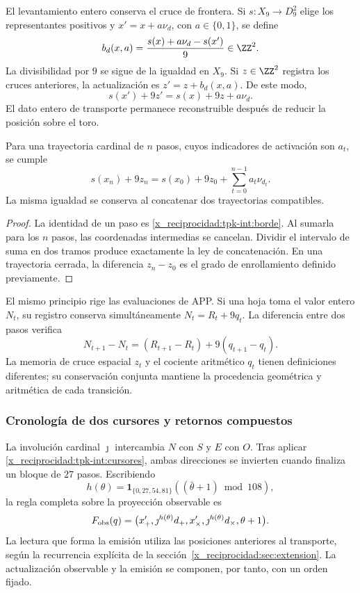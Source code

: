 El levantamiento entero conserva el cruce de frontera. Si
\(s:X_9\to D_9^2\) elige los representantes positivos y
\(x'=x+a\nu_d\), con \(a\in\{0,1\}\), se define
\begin{equation}
 b_d(x,a)=\frac{s(x)+a\nu_d-s(x')}{9}\in\ZZ^2.
 \label{x_reciprocidad:tpk-int:borde}
\end{equation}
La divisibilidad por \(9\) se sigue de la igualdad en \(X_9\).
Si \(z\in\ZZ^2\) registra los cruces anteriores, la actualización es
\(z'=z+b_d(x,a)\). De este modo,
\[
 s(x')+9z'=s(x)+9z+a\nu_d.
\]
El dato entero de transporte permanece reconstruible después de reducir
la posición sobre el toro.

\begin{proposition}
\label{x_reciprocidad:tpk-int:prop-desplazamiento}
Para una trayectoria cardinal de \(n\) pasos, cuyos indicadores de
activación son \(a_t\), se cumple
\[
 s(x_n)+9z_n=s(x_0)+9z_0+
 \sum_{t=0}^{n-1}a_t\nu_{d_t}.
\]
La misma igualdad se conserva al concatenar dos trayectorias compatibles.
\end{proposition}
\begin{proof}
La identidad de un paso es \eqref{x_reciprocidad:tpk-int:borde}. Al sumarla para los
\(n\) pasos, las coordenadas intermedias se cancelan. Dividir el intervalo
de suma en dos tramos produce exactamente la ley de concatenación. En una
trayectoria cerrada, la diferencia \(z_n-z_0\) es el grado de
enrollamiento definido previamente.
\end{proof}

El mismo principio rige las evaluaciones de APP. Si una hoja toma el
valor entero \(N_t\), su registro conserva simultáneamente
\(N_t=R_t+9q_t\). La diferencia entre dos pasos verifica
\[
 N_{t+1}-N_t=(R_{t+1}-R_t)+9(q_{t+1}-q_t).
\]
La memoria de cruce espacial \(z_t\) y el cociente aritmético \(q_t\)
tienen definiciones diferentes; su conservación conjunta mantiene la
procedencia geométrica y aritmética de cada transición.

\subsubsection{Cronología de dos cursores y retornos compuestos}
\label{x_reciprocidad:tpk-int:cronologia}

La involución cardinal \(\jmath\) intercambia \(N\) con \(S\) y
\(E\) con \(O\). Tras aplicar \eqref{x_reciprocidad:tpk-int:cursores}, ambas
direcciones se invierten cuando finaliza un bloque de \(27\) pasos.
Escribiendo
\[
 h(\theta)=\mathbf1_{\{0,27,54,81\}}
             ((\bar\theta+1)\bmod108),
\]
la regla completa sobre la proyección observable es
\begin{equation}
 F_{\rm obs}(q)=
 \bigl(x_+',\jmath^{h(\theta)}d_+,
       x_\times',\jmath^{h(\theta)}d_\times,
       \theta+1\bigr).
 \label{x_reciprocidad:tpk-int:fobs}
\end{equation}
La lectura que forma la emisión utiliza las posiciones anteriores al
transporte, según la recurrencia explícita de la
sección~\ref{x_reciprocidad:sec:extension}. La actualización observable y la emisión
se componen, por tanto, con un orden fijado.

